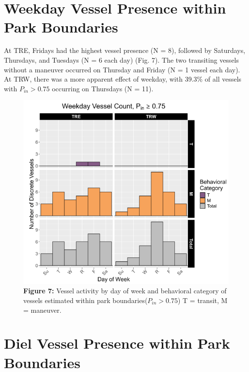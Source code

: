 \documentclass[
  letterpaper,
  oneside,
  open=any]{scrbook}
\begin{document}
\section{Weekday Vessel Presence within Park
Boundaries}\label{weekday-vessel-presence-within-park-boundaries}

At TRE, Fridays had the highest vessel presence (N = 8), followed by
Saturdays, Thursdays, and Tuesdays (N = 6 each day) (Fig. 7). The two
transiting vessels without a maneuver occurred on Thursday and Friday (N
= 1 vessel each day). At TRW, there was a more apparent effect of
weekday, with 39.3\% of all vessels with \(P_{in} > 0.75\) occurring on
Thursdays (N = 11).

\begin{figure}[H]

{\centering \includegraphics{images/Figure.7.PNG}

}

\caption{\textbf{Figure 7:} Vessel activity by day of week and
behavioral category of vessels estimated within park
boundaries(\(P_{in} > 0.75\)) T = transit, M = maneuver.}

\end{figure}%

\section{Diel Vessel Presence within Park
Boundaries}\label{diel-vessel-presence-within-park-boundaries}
\end{document}
